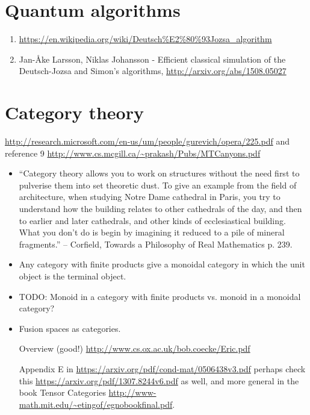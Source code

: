 \documentclass[a4paper,10pt,oneside]{book}
\theoremstyle{plain}
\theoremstyle{definition}
\theoremstyle{remark}
\begin{document}
{\chapter{Quantum algorithms}

\begin{enumerate}
  \item \url{https://en.wikipedia.org/wiki/Deutsch%E2%80%93Jozsa_algorithm}
  \item Jan-Åke Larsson, Niklas Johansson - Efficient classical simulation of the Deutsch-Jozsa and Simon's algorithms, \url{http://arxiv.org/abs/1508.05027}
\end{enumerate}


\chapter{Category theory}

\url{http://research.microsoft.com/en-us/um/people/gurevich/opera/225.pdf} and reference 9 \url{http://www.cs.mcgill.ca/~prakash/Pubs/MTCanyons.pdf}

\begin{itemize}
  \item
    ``Category theory allows you to work on structures without the need first to pulverise them into set theoretic dust. To give an example from the field of architecture, when studying Notre Dame cathedral in Paris, you try to understand how the building relates to other cathedrals of the day, and then to earlier and later cathedrals, and other kinds of ecclesiastical building. What you don't do is begin by imagining it reduced to a pile of mineral fragments.'' -- Corfield, Towards a Philosophy of Real Mathematics p. 239.

  \item
    Any category with finite products give a monoidal category in which the unit object is the terminal object.

  \item
    TODO: Monoid in a category with finite products vs. monoid in a monoidal category?

  \item
    Fusion spaces as categories.

    Overview (good!) \url{http://www.cs.ox.ac.uk/bob.coecke/Eric.pdf}

    Appendix E in \url{https://arxiv.org/pdf/cond-mat/0506438v3.pdf} perhaps check this \url{https://arxiv.org/pdf/1307.8244v6.pdf} as well, and more general in the book Tensor Categories \url{http://www-math.mit.edu/~etingof/egnobookfinal.pdf}.


\end{itemize}}
\end{document}
